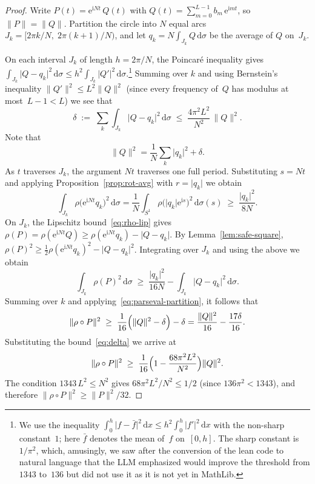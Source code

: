 \documentclass[11pt]{amsart}
\theoremstyle{remark}
\begin{document}
\begin{proof}
Write $P(t) = \mathrm{e}^{\mathrm{i} Nt}\,Q(t)$ with
$Q(t) = \sum_{m=0}^{L-1} b_m\,\mathrm{e}^{\mathrm{i} mt}$, so $\lVert P \rVert = \lVert Q \rVert$.
Partition the circle into $N$ equal arcs
$J_k = [2\pi k/N,\; 2\pi(k+1)/N)$, and let
$q_k = N\!\int_{J_k}\! Q\,\mathrm{d}\sigma$ be the average of $Q$ on~$J_k$.
\medskip

On each interval $J_k$ of length $h = 2\pi/N$, the Poincar\'e
inequality gives
$\int_{J_k}\lvert Q - q_k \rvert^2\,\mathrm{d}\sigma \le h^2\int_{J_k}\lvert Q' \rvert^2\,
\mathrm{d}\sigma$.\footnote{We use the inequality
$\int_0^h \lvert f - \bar f \rvert^2\,\mathrm{d} x
\le h^2\int_0^h\lvert f' \rvert^2\,\mathrm{d} x$
with the non-sharp constant~$1$; here $\bar f$ denotes the mean of~$f$
on~$[0,h]$.  The sharp 
constant is $1/\pi^2$, which, amusingly, we saw after the conversion of the lean code to natural language that the LLM emphasized would improve the threshold from $1343$ to~$136$ but did not use it as it is not yet in MathLib.}
Summing over $k$ and using Bernstein's inequality $\lVert Q' \rVert^2 \le L^2\lVert Q \rVert^2$
(since every frequency of~$Q$ has modulus at most~$L{-}1 < L$) we see that
\begin{equation}\label{eq:delta}
\delta \;:=\; \sum_{k} \int_{J_k}\lvert Q - q_k \rvert^2\,\mathrm{d}\sigma
\;\le\; \frac{4\pi^2 L^2}{N^2}\,\lVert Q \rVert^2.
\end{equation}
Note that
\begin{equation}\label{eq:parseval-partition}
\lVert Q \rVert^2
= \frac{1}{N}\sum_{k}\lvert q_k \rvert^2 + \delta.
\end{equation}
As $t$ traverses $J_k$, the argument $Nt$ traverses one full period.
Substituting $s = Nt$ and applying Proposition~\ref{prop:rot-avg} with
$r = \lvert q_k \rvert$ we obtain
\[
\int_{J_k}\rho\bigl(\mathrm{e}^{\mathrm{i} Nt} q_k\bigr)^2\,\mathrm{d}\sigma
= \frac{1}{N}\int_{S^1}\rho\bigl(\lvert q_k \rvert\mathrm{e}^{\mathrm{i} s}\bigr)^2\,\mathrm{d}\sigma(s)
\;\ge\; \frac{\lvert q_k \rvert^2}{8N}.
\]
On $J_k$, the Lipschitz bound~\eqref{eq:rho-lip} gives
$\rho(P) = \rho(\mathrm{e}^{\mathrm{i} Nt}Q)
\ge \rho(\mathrm{e}^{\mathrm{i} Nt}q_k) - \lvert Q - q_k \rvert$.
By Lemma~\ref{lem:safe-square},
$\rho(P)^2 \ge \tfrac{1}{2}\rho(\mathrm{e}^{\mathrm{i} Nt}q_k)^2 - \lvert Q - q_k \rvert^2$.
Integrating over $J_k$ and using the above we obtain
\[
\int_{J_k}\rho(P)^2\,\mathrm{d}\sigma
\;\ge\; \frac{\lvert q_k \rvert^2}{16N} - \int_{J_k}\lvert Q-q_k \rvert^2\,\mathrm{d}\sigma.
\]
Summing over $k$ and applying~\eqref{eq:parseval-partition}, it follows that
\[
\lVert \rho \circ P \rVert^2
\;\ge\; \frac{1}{16}\Bigl(\lVert Q \rVert^2 - \delta\Bigr) - \delta
= \frac{\lVert Q \rVert^2}{16} - \frac{17\delta}{16}.
\]
Substituting the bound~\eqref{eq:delta} we arrive at
\[
\lVert \rho \circ P \rVert^2
\;\ge\;
\frac{1}{16}\Bigl(1 - \frac{68\pi^2 L^2}{N^2}\Bigr)\lVert Q \rVert^2.
\]
The condition $1343\,L^2 \le N^2$ gives $68\pi^2 L^2/N^2 \le 1/2$
(since $136\pi^2 < 1343$), and therefore
$\lVert \rho \circ P \rVert^2 \ge \lVert P \rVert^2/32$.
\end{proof}
\end{document}
